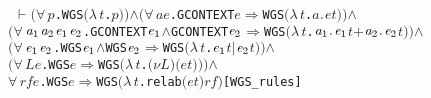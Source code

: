 \documentclass[GCNS]{yincog}
\renewcommand{\HOLConst}[1]{\texttt{#1}}
\renewcommand{\HOLBoundVar}[1]{\ensuremath{\mathit{#1}}}
\renewcommand{\HOLSymConst}[1]{#1}
\renewcommand{\HOLTokenConj}{\ensuremath{\wedge}}
\renewcommand{\HOLTokenForall}{\ensuremath{\forall \,}}
\renewcommand{\HOLTokenLambda}{\ensuremath{\lambda \,}}
\renewcommand{\HOLTokenTurnstile}{\ensuremath{\:\:\vdash}}
\theoremstyle{remark}
\theoremstyle{theorem}
\theoremstyle{remark}
\renewcommand{\HOLTokenImp}{\ensuremath{\Longrightarrow}}
\begin{document}
%
\begin{alltt}
\HOLTokenTurnstile{} \ensuremath{(}\HOLSymConst{\HOLTokenForall{}}\HOLBoundVar{p}. \HOLConst{WGS} \ensuremath{(}\HOLTokenLambda{}\HOLBoundVar{t}. \HOLBoundVar{p}\ensuremath{)}\ensuremath{)} \HOLSymConst{\HOLTokenConj{}} \ensuremath{(}\HOLSymConst{\HOLTokenForall{}}\HOLBoundVar{a} \HOLBoundVar{e}. \HOLConst{GCONTEXT} \HOLBoundVar{e} \HOLSymConst{\HOLTokenImp{}} \HOLConst{WGS} \ensuremath{(}\HOLTokenLambda{}\HOLBoundVar{t}. \HOLBoundVar{a}\HOLSymConst{\ensuremath{\ldotp}}\HOLBoundVar{e} \HOLBoundVar{t}\ensuremath{)}\ensuremath{)} \HOLSymConst{\HOLTokenConj{}}
   \ensuremath{(}\HOLSymConst{\HOLTokenForall{}}\ensuremath{\HOLBoundVar{a}\sb{\mathrm{1}}} \ensuremath{\HOLBoundVar{a}\sb{\mathrm{2}}} \ensuremath{\HOLBoundVar{e}\sb{\mathrm{1}}} \ensuremath{\HOLBoundVar{e}\sb{\mathrm{2}}}. \HOLConst{GCONTEXT} \ensuremath{\HOLBoundVar{e}\sb{\mathrm{1}}} \HOLSymConst{\HOLTokenConj{}} \HOLConst{GCONTEXT} \ensuremath{\HOLBoundVar{e}\sb{\mathrm{2}}} \HOLSymConst{\HOLTokenImp{}} \HOLConst{WGS} \ensuremath{(}\HOLTokenLambda{}\HOLBoundVar{t}. \ensuremath{\HOLBoundVar{a}\sb{\mathrm{1}}}\HOLSymConst{\ensuremath{\ldotp}}\ensuremath{\HOLBoundVar{e}\sb{\mathrm{1}}} \HOLBoundVar{t} \HOLSymConst{\ensuremath{+}} \ensuremath{\HOLBoundVar{a}\sb{\mathrm{2}}}\HOLSymConst{\ensuremath{\ldotp}}\ensuremath{\HOLBoundVar{e}\sb{\mathrm{2}}} \HOLBoundVar{t}\ensuremath{)}\ensuremath{)} \HOLSymConst{\HOLTokenConj{}}
   \ensuremath{(}\HOLSymConst{\HOLTokenForall{}}\ensuremath{\HOLBoundVar{e}\sb{\mathrm{1}}} \ensuremath{\HOLBoundVar{e}\sb{\mathrm{2}}}. \HOLConst{WGS} \ensuremath{\HOLBoundVar{e}\sb{\mathrm{1}}} \HOLSymConst{\HOLTokenConj{}} \HOLConst{WGS} \ensuremath{\HOLBoundVar{e}\sb{\mathrm{2}}} \HOLSymConst{\HOLTokenImp{}} \HOLConst{WGS} \ensuremath{(}\HOLTokenLambda{}\HOLBoundVar{t}. \ensuremath{\HOLBoundVar{e}\sb{\mathrm{1}}} \HOLBoundVar{t} \HOLSymConst{\ensuremath{\mid}} \ensuremath{\HOLBoundVar{e}\sb{\mathrm{2}}} \HOLBoundVar{t}\ensuremath{)}\ensuremath{)} \HOLSymConst{\HOLTokenConj{}}
   \ensuremath{(}\HOLSymConst{\HOLTokenForall{}}\HOLBoundVar{L} \HOLBoundVar{e}. \HOLConst{WGS} \HOLBoundVar{e} \HOLSymConst{\HOLTokenImp{}} \HOLConst{WGS} \ensuremath{(}\HOLTokenLambda{}\HOLBoundVar{t}. \ensuremath{(\nu}\HOLBoundVar{L}\ensuremath{)} \ensuremath{(}\HOLBoundVar{e} \HOLBoundVar{t}\ensuremath{)}\ensuremath{)}\ensuremath{)} \HOLSymConst{\HOLTokenConj{}}
   \HOLSymConst{\HOLTokenForall{}}\HOLBoundVar{rf} \HOLBoundVar{e}. \HOLConst{WGS} \HOLBoundVar{e} \HOLSymConst{\HOLTokenImp{}} \HOLConst{WGS} \ensuremath{(}\HOLTokenLambda{}\HOLBoundVar{t}. \HOLConst{relab} \ensuremath{(}\HOLBoundVar{e} \HOLBoundVar{t}\ensuremath{)} \HOLBoundVar{rf}\ensuremath{)}\hfill{[WGS\_rules]}
\end{alltt}
\end{document}
